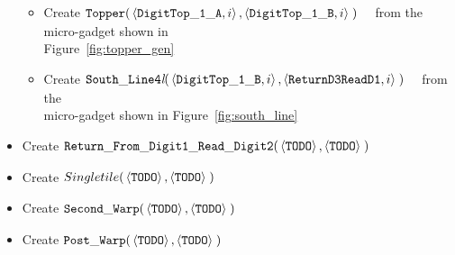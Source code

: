 \begin{itemize}
\begin{itemize}
            \item Create
            $\begin{aligned}[t]
                {\tt Topper}(& \left \langle {\tt DigitTop\_1\_A}, i \right\rangle,
                               \left \langle {\tt DigitTop\_1\_B}, i \right\rangle \;)
            \end{aligned}$ from the micro-gadget shown in\\ Figure~\ref{fig:topper_gen}

            \item Create
            $\begin{aligned}[t]
                {\tt South\_Line4\textit{l}}(& \left \langle {\tt DigitTop\_1\_B}, i \right\rangle,
                                               \left \langle {\tt ReturnD3ReadD1}, i \right\rangle \;)
            \end{aligned}$ from the\\micro-gadget shown in Figure~\ref{fig:south_line}
        \end{itemize}




        \item Create
        $\begin{aligned}[t]
            {\tt Return\_From\_Digit1\_Read\_Digit2}(&\left\langle {\tt TODO} \right\rangle,
                                     \left\langle {\tt TODO} \right\rangle \;)
        \end{aligned}$

        \item Create
        $\begin{aligned}[t]
            Single tile(&\left\langle {\tt TODO} \right\rangle,
                         \left\langle {\tt TODO} \right\rangle \;)
        \end{aligned}$

        \item Create
        $\begin{aligned}[t]
            {\tt Second\_Warp}(&\left\langle {\tt TODO} \right\rangle,
                         \left\langle {\tt TODO} \right\rangle \;)
        \end{aligned}$

        \item Create
        $\begin{aligned}[t]
            {\tt Post\_Warp}(&\left\langle {\tt TODO} \right\rangle,
                       \left\langle {\tt TODO} \right\rangle \;)
        \end{aligned}$


\end{itemize}
